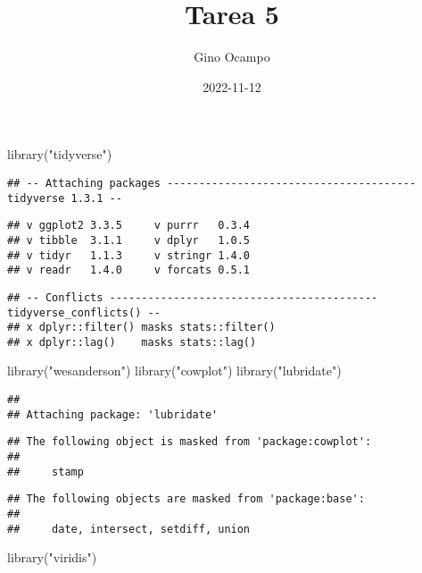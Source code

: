 \documentclass[
]{article}
\title{Tarea 5}
\author{Gino Ocampo}
\date{2022-11-12}
\newenvironment{Shaded}{\begin{snugshade}}{\end{snugshade}}
\newcommand{\FunctionTok}[1]{\textcolor[rgb]{0.00,0.00,0.00}{#1}}
\newcommand{\NormalTok}[1]{#1}
\newcommand{\StringTok}[1]{\textcolor[rgb]{0.31,0.60,0.02}{#1}}
\begin{document}
\maketitle

\begin{Shaded}
\begin{Highlighting}[]
\FunctionTok{library}\NormalTok{(}\StringTok{"tidyverse"}\NormalTok{)}
\end{Highlighting}
\end{Shaded}

\begin{verbatim}
## -- Attaching packages --------------------------------------- tidyverse 1.3.1 --
\end{verbatim}

\begin{verbatim}
## v ggplot2 3.3.5     v purrr   0.3.4
## v tibble  3.1.1     v dplyr   1.0.5
## v tidyr   1.1.3     v stringr 1.4.0
## v readr   1.4.0     v forcats 0.5.1
\end{verbatim}

\begin{verbatim}
## -- Conflicts ------------------------------------------ tidyverse_conflicts() --
## x dplyr::filter() masks stats::filter()
## x dplyr::lag()    masks stats::lag()
\end{verbatim}

\begin{Shaded}
\begin{Highlighting}[]
\FunctionTok{library}\NormalTok{(}\StringTok{"wesanderson"}\NormalTok{)}
\FunctionTok{library}\NormalTok{(}\StringTok{"cowplot"}\NormalTok{)}
\FunctionTok{library}\NormalTok{(}\StringTok{"lubridate"}\NormalTok{)}
\end{Highlighting}
\end{Shaded}

\begin{verbatim}
## 
## Attaching package: 'lubridate'
\end{verbatim}

\begin{verbatim}
## The following object is masked from 'package:cowplot':
## 
##     stamp
\end{verbatim}

\begin{verbatim}
## The following objects are masked from 'package:base':
## 
##     date, intersect, setdiff, union
\end{verbatim}

\begin{Shaded}
\begin{Highlighting}[]
\FunctionTok{library}\NormalTok{(}\StringTok{"viridis"}\NormalTok{)}
\end{Highlighting}
\end{Shaded}
\end{document}
